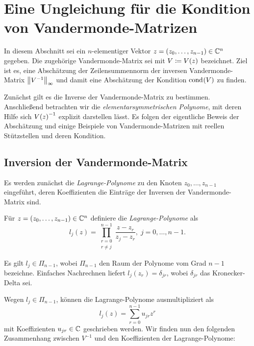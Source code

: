 \chapter{Eine Ungleichung für die Kondition von Vandermonde-Matrizen}
In diesem Abschnitt sei ein $n$-elementiger Vektor $z = (z_0, \dots, z_{n-1})
\in \mathbb{C}^n$ gegeben.  Die zugehörige Vandermonde-Matrix sei mit $V \coloneqq
V \! \left( z \right)$ bezeichnet.  Ziel ist es, eine Abschätzung der Zeilensummennorm der
inversen Vandermonde-Matrix $\left\lVert V^{-1} \right\rVert_{\infty}$ und damit eine Abschätzung der
Kondition $\text{cond}_{{}}\! \left( V \right)$ zu finden.

Zunächst gilt es die Inverse der Vandermonde-Matrix zu bestimmen. Anschließend
betrachten wir die \emph{elementarsymmetrischen Polynome}, mit deren Hilfe sich
$V \! \left( z \right)^{-1}$ explizit darstellen lässt. Es folgen der eigentliche Beweis der
Abschätzung und einige Beispiele von Vandermonde-Matrizen mit reellen
Stützstellen und deren Kondition.


\section{Inversion der Vandermonde-Matrix}
Es werden zunächst die \emph{Lagrange-Polynome} zu den Knoten
$z_0, \dots, z_{n-1}$ eingeführt, deren Koeffizienten die Einträge der
Inversen der Vandermonde-Matrix sind.

\begin{mydef}
    Für $ z = (z_0, \dots, z_{n-1}) \in \mathbb{C}^n $ definiere die
    \emph{Lagrange-Polynome} als
    \[
        l_j(z) = \prod_{\substack{r=0\\ r \neq j}}^{n-1} \frac{z - z_r}{z_j - z_r}, \; j = 0, \dots, n-1.
    \]
\end{mydef}

\begin{remark}
    Es gilt $l_j \in \Pi_{n-1}$, wobei $\Pi_{n-1}$ den Raum der Polynome vom
    Grad $n-1$ bezeichne.  Einfaches Nachrechnen liefert
    $l_j(z_r) = \delta_{jr}$, wobei $\delta_{jr}$ das Kronecker-Delta
    sei.
\end{remark}

Wegen $l_j \in \Pi_{n-1}$, können die Lagrange-Polynome ausmultipliziert als
\begin{equation}
    \label{eq:lagrange}
    l_j(z) = \sum_{r = 0}^{n-1} u_{jr} z^{r}
\end{equation}
mit Koeffizienten $u_{jr} \in \mathbb{C}$ geschrieben werden.
Wir finden nun den folgenden Zusammenhang zwischen $V^{-1}$ und den
Koeffizienten der Lagrange-Polynome:

